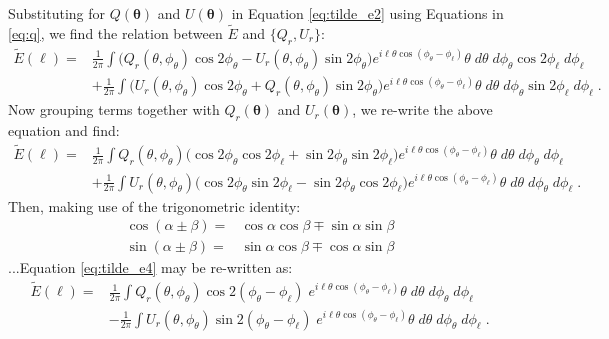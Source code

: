Substituting for $Q(\boldsymbol{\theta})$ and $U(\boldsymbol{\theta})$ in Equation \ref{eq:tilde_e2} using Equations in \ref{eq:q}, we find the relation between $\tilde{E}$ and $\{Q_r,U_r\}$:
\begin{equation} \label{eq:tilde_e3}
\begin{split}
    \tilde{E}(\ell) = & \frac{1}{2\pi} \int \big(Q_r(\theta,\phi_{\theta})\cos 2\phi_{\theta} - U_r(\theta,\phi_{\theta})\sin 2\phi_{\theta}\big) e^{i\ell\theta\cos(\phi_{\theta} - \phi_{\ell})} \theta\;d\theta\;d\phi_{\theta} \cos 2\phi_{\ell}\;d\phi_{\ell} \\ & 
    + \frac{1}{2\pi} \int \big(U_r(\theta,\phi_{\theta})\cos 2\phi_{\theta} + Q_r(\theta,\phi_{\theta})\sin 2\phi_{\theta}\big) e^{i\ell\theta\cos(\phi_{\theta} - \phi_{\ell})} \theta\;d\theta\;d\phi_{\theta} \sin 2\phi_{\ell}\;d\phi_{\ell}\; .
\end{split}
\end{equation}
Now grouping terms together with $Q_r(\boldsymbol{\theta})$ and $U_r(\boldsymbol{\theta})$, we re-write the above equation and find:
\begin{equation} \label{eq:tilde_e4}
\begin{split}
    \tilde{E}(\ell) = & \frac{1}{2\pi} \int Q_r(\theta,\phi_{\theta})\big(\cos 2\phi_{\theta} \cos 2\phi_{\ell} + \sin 2\phi_{\theta} \sin 2\phi_{\ell}\big) e^{i\ell\theta\cos(\phi_{\theta} - \phi_{\ell})} \theta\;d\theta\;d\phi_{\theta}\;d\phi_{\ell} \\ &
    + \frac{1}{2\pi} \int U_r(\theta,\phi_{\theta})\big(\cos 2\phi_{\theta} \sin 2\phi_{\ell} - \sin 2\phi_{\theta} \cos 2\phi_{\ell}\big) e^{i\ell\theta\cos(\phi_{\theta} - \phi_{\ell})} \theta\;d\theta\;d\phi_{\theta}\;d\phi_{\ell}\; .
\end{split}
\end{equation}
Then, making use of the trigonometric identity:
\begin{equation}
    \begin{split}
        \cos(\alpha\pm\beta) =& \cos\alpha\cos\beta \mp \sin\alpha\sin\beta \\
        \sin(\alpha\pm\beta) =& \sin\alpha\cos\beta \mp \cos\alpha\sin\beta
    \end{split}
\end{equation}
...Equation \ref{eq:tilde_e4} may be re-written as:
\begin{equation} \label{eq:tilde_e5}
\begin{split}
    \tilde{E}(\ell) = & \frac{1}{2\pi} \int Q_r(\theta,\phi_{\theta})\cos 2(\phi_{\theta}-\phi_{\ell})\;e^{i\ell\theta\cos(\phi_{\theta} - \phi_{\ell})} \theta\;d\theta\;d\phi_{\theta}\;d\phi_{\ell} \\ &
    - \frac{1}{2\pi} \int U_r(\theta,\phi_{\theta})\sin 2(\phi_{\theta}-\phi_{\ell})\;e^{i\ell\theta\cos(\phi_{\theta} - \phi_{\ell})} \theta\;d\theta\;d\phi_{\theta}\;d\phi_{\ell} \; .
\end{split}
\end{equation}

